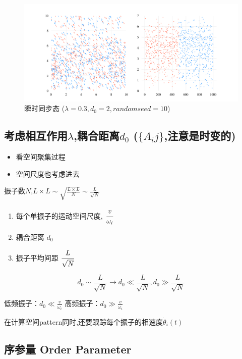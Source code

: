 \documentclass{article}
\begin{document}
\begin{figure}[H]
	\centering
	\includegraphics[width=\textwidth]{./figs/CorrectCoupling_uniform_0.300_2.00_10_radius.png}
	\vspace{-1cm}
	\caption{瞬时同步态 ($\lambda=0.3, d_0=2, random seed=10$)}
	\label{fig:fig22.4}
\end{figure}

\subsection{考虑相互作用$\lambda$,耦合距离$d_0$ ($\{A_ij\}$,注意是时变的)}

\begin{itemize}
    \item 看空间聚集过程
    \item 空间尺度也考虑进去
\end{itemize}

振子数$N$,$L\times L\sim \sqrt{\frac{L\times L}{N}}\sim \frac{L}{\sqrt{N}}$

\begin{enumerate}
    \item 每个单振子的运动空间尺度, $\cfrac{v}{\omega_i}$
    \item 耦合距离 $d_0$
    \item 振子平均间距 $\cfrac{L}{\sqrt{N}}$
\end{enumerate}

$$
d_0\sim \frac{L}{\sqrt{N}}\rightarrow d_0\ll \frac{L}{\sqrt{N}}, d_0\gg \frac{L}{\sqrt{N}}
$$

低频振子：$d_0\ll \frac{v}{\omega _i}$
高频振子：$d_0\gg \frac{v}{\omega _i}$

在计算空间pattern同时,还要跟踪每个振子的相速度$\dot{\theta}_i(t)$

\newpage
\subsection{序参量 Order Parameter}
\end{document}
